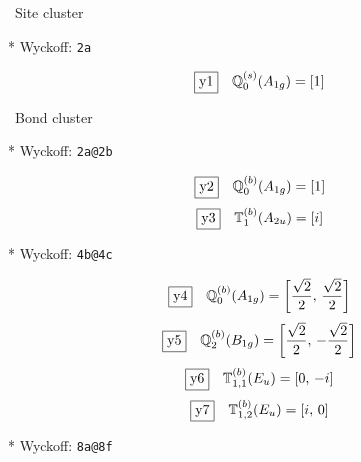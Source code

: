 \documentclass[fleqn,10pt,landscape]{jsarticle}
\begin{document}
\noindent\textbullet\, Site cluster

\vspace{5mm}

\noindent ** Wyckoff: \texttt{2a}

\begin{dmath*}
\fbox{y1}\quad \mathbb{Q}_{0}^{(s)}(A_{1g})=\left[ 1 \right]
\end{dmath*}
\vspace{5mm}

\noindent\textbullet\, Bond cluster

\vspace{5mm}

\noindent ** Wyckoff: \texttt{2a@2b}

\begin{dmath*}
\fbox{y2}\quad \mathbb{Q}_{0}^{(b)}(A_{1g})=\left[ 1 \right]
\end{dmath*}
\begin{dmath*}
\fbox{y3}\quad \mathbb{T}_{1}^{(b)}(A_{2u})=\left[ i \right]
\end{dmath*}
\vspace{5mm}

\noindent ** Wyckoff: \texttt{4b@4c}

\begin{dmath*}
\fbox{y4}\quad \mathbb{Q}_{0}^{(b)}(A_{1g})=\left[ \frac{\sqrt{2}}{2},\, \frac{\sqrt{2}}{2} \right]
\end{dmath*}
\begin{dmath*}
\fbox{y5}\quad \mathbb{Q}_{2}^{(b)}(B_{1g})=\left[ \frac{\sqrt{2}}{2},\, - \frac{\sqrt{2}}{2} \right]
\end{dmath*}
\begin{dmath*}
\fbox{y6}\quad \mathbb{T}_{1,1}^{(b)}(E_{u})=\left[ 0,\, - i \right]
\end{dmath*}
\begin{dmath*}
\fbox{y7}\quad \mathbb{T}_{1,2}^{(b)}(E_{u})=\left[ i,\, 0 \right]
\end{dmath*}
\vspace{5mm}

\noindent ** Wyckoff: \texttt{8a@8f}
\end{document}

